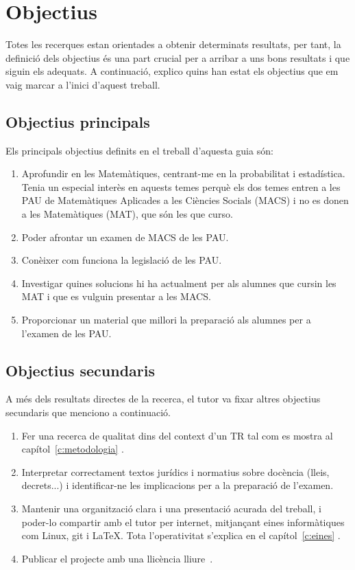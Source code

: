 \chapter{Objectius}

Totes les recerques estan orientades a obtenir determinats resultats, per tant, la definició dels objectius és una part crucial per a arribar a uns bons resultats i que siguin els adequats. A continuació, explico quins han estat els objectius que em vaig marcar a l'inici d'aquest treball.

\section{Objectius principals}
Els principals objectius definits en el treball d'aquesta guia són:
\begin{enumerate}
  \item Aprofundir en les Matemàtiques, centrant-me en la probabilitat i estadística. Tenia un especial interès en aquests temes perquè els dos temes entren a les PAU de Matemàtiques Aplicades a les Ciències Socials (MACS) i no es donen a les Matemàtiques (MAT), que són les que curso.
  \item Poder afrontar un examen de MACS de les PAU.
  \item Conèixer com funciona la legislació de les PAU.
  \item Investigar quines solucions hi ha actualment per als alumnes que cursin les MAT i que es vulguin presentar a les MACS.
  \item Proporcionar un material que millori la preparació als alumnes per a l'examen de les PAU.
\end{enumerate}

\section{Objectius secundaris}
A més dels resultats directes de la recerca, el tutor va fixar altres objectius secundaris que menciono a continuació.
\begin{enumerate}
  \item Fer una recerca de qualitat dins del context d'un TR tal com es mostra al capítol~\ref{c:metodologia} .
  \item Interpretar correctament textos jurídics i normatius sobre docència (lleis, decrets...) i identificar-ne les implicacions per a la preparació de l'examen.
  \item Mantenir una organització clara i una presentació acurada del treball, i poder-lo compartir amb el tutor per internet, mitjançant eines informàtiques com Linux, git i \LaTeX. Tota l'operativitat s'explica en el capítol~\ref{c:eines} .
  \item Publicar el projecte amb una llicència lliure~\cite{GNU-ca}.
\end{enumerate}
